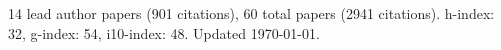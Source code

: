 14 lead author papers (901 citations),
60 total papers (2941 citations).\newline
h-index: 32, g-index: 54, i10-index: 48. Updated \today.